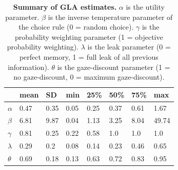 \documentclass[11pt, a4paper]{article}
\begin{document}
\begin{refsection}
\begin{table}[h!]
\begin{centering}
\begin{tabular}{@{}llllllll@{}}
\toprule
       & mean & SD   & min  & 25\% & 50\% & 75\% & max   \\ \midrule
$\alpha$  & 0.47 & 0.35 & 0.05 & 0.25 & 0.37 & 0.61 & 1.67  \\
$\beta$   & 6.81 & 9.87 & 0.04 & 1.13 & 3.25 & 8.04 & 49.74 \\
$\gamma$  & 0.81 & 0.25 & 0.22 & 0.58 & 1.0  & 1.0  & 1.0   \\
$\lambda$ & 0.29 & 0.2  & 0.08 & 0.14 & 0.23 & 0.46 & 0.65  \\
$\theta$  & 0.69 & 0.18 & 0.13 & 0.63 & 0.72 & 0.83 & 0.95  \\ \bottomrule
\end{tabular}
\caption{\textbf{Summary of GLA estimates.} $\alpha$ is the utility parameter. $\beta$ is the inverse temperature parameter of the choice rule (0 = random choice). $\gamma$ is the probability weighting parameter (1 = objective probability weighting). $\lambda$ is the leak parameter (0 = perfect memory, 1 = full leak of all previous information). $\theta$ is the gaze-discount parameter (1 = no gaze-discount, 0 = maximum gaze-discount).}
\label{tab:gla-estimates}
\end{centering}
\end{table}
\clearpage


\end{refsection}
\end{document}
